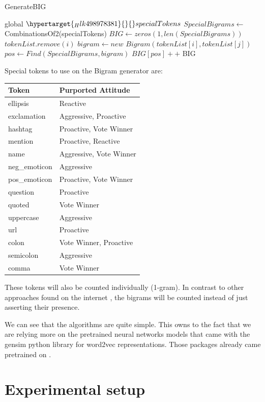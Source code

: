 \documentclass[author-year, review]{elsarticle} %
\let\parencite\cite
\begin{document}
 \begin{algorithm}[H]
\caption{ GenerateBIG}\label{alg:minerpattern}
\begin{algorithmic}[1]
\State global $ \protect\hypertarget{_Hlk498978381}{}{}specialTokens $ 
\State $ SpecialBigrams \gets $ CombinationsOf2(specialTokens)
\State $ BIG \gets zeros(1,len(SpecialBigrams))$
$tokenList.remove(i)$
\EndIf
\EndForeach
{}
\State $ bigram \gets new $ $ Bigram(tokenList[i], tokenList[j])$
\State $ pos \gets Find(SpecialBigrams, bigram)$
\State $ BIG[pos]++ $ \EndFor
\EndFor
\State\Return BIG
\EndProcedure
\end{algorithmic}
\end{algorithm}


Special tokens to use on the Bigram generator are:

\begin{longtable}[]{@{}ll@{}}
\toprule
Token & Purported Attitude\tabularnewline
\midrule
\endhead
ellipsis & Reactive\tabularnewline
exclamation & Aggressive, Proactive\tabularnewline
hashtag & Proactive, Vote Winner\tabularnewline
mention & Proactive, Reactive\tabularnewline
name & Aggressive, Vote Winner\tabularnewline
neg\_emoticon & Aggressive\tabularnewline
pos\_emoticon & Proactive, Vote Winner\tabularnewline
question & Proactive\tabularnewline
quoted & Vote Winner\tabularnewline
uppercase & Aggressive\tabularnewline
url & Proactive\tabularnewline
colon & Vote Winner, Proactive\tabularnewline
semicolon & Aggressive\tabularnewline
comma & Vote Winner\tabularnewline
\bottomrule
\end{longtable}

These tokens will also be counted individually (1-gram). In contrast to
other approaches found on the internet
\parencite{2017b},
the bigrams will be counted instead of just asserting their presence.

We can see that the algorithms are quite simple. This owns to the fact
that we are relying more on the pretrained neural networks models that
came with the gensim python library for word2vec representations. Those
packages already came pretrained on
\parencite{2017c}.

\section{Experimental setup}\label{experimental-setup}
\end{document}
